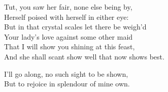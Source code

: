 \begin{speech}
Tut, you saw her fair, none else being by, \\
Herself poised with herself in either eye: \\
But in that crystal scales let there be weigh'd \\
Your lady's love against some other maid \\
That I will show you shining at this feast, \\
And she shall scant show well that now shows best. \\
\end{speech}
\begin{speech}
I'll go along, no such sight to be shown, \\
But to rejoice in splendour of mine own.  \\

\end{speech}


